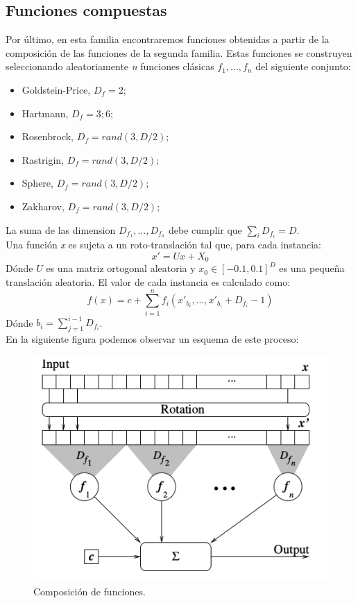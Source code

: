 \subsection{Funciones compuestas} 

Por último, en esta familia encontraremos funciones obtenidas a partir de la composición de las funciones de la segunda familia. Estas funciones se construyen seleccionando aleatoriamente \textit{n} funciones clásicas $f_{1},...,f_{n}$ del siguiente conjunto: 
    	  \begin{itemize}
    	  	\item Goldstein-Price, $D_{f} = 2$;
    	  	\item Hartmann, $D_{f} = 3; 6;$
    	  	\item Rosenbrock, $D_{f} = rand(3, D/2);$
    	  	\item Rastrigin, $D_{f} = rand(3, D/2);$
    	  	\item Sphere, $D_{f} = rand(3, D/2);$
    	  	\item Zakharov, $D_{f} = rand(3, D/2);$
    	  \end{itemize}
    La suma de las dimension $D_{f_{1}},...,D_{f_{n}}$ debe cumplir que $\sum_{i}{D_{f_{i}}} = D$. \\
    Una función \textit{x} es sujeta a un roto-translación tal que, para cada instancia: 
    \begin{equation}
    	x' = Ux + X_{0}
    \end{equation}
    Dónde $U$ es una matriz ortogonal aleatoria y $x_{0}\in[-0.1, 0.1]^{D}$ es una pequeña translación aleatoria. El valor de cada instancia es calculado como: 
    \begin{equation}
    	f(x) = c + \sum^{n}_{i=1}{f_{i}(x'_{b_{i}},...,x'_{b_{i}} + D_{f_{i}} - 1)}
    \end{equation}
    Dónde $b_{i} = \sum^{i-1}_{j=1}{D_{f_{i}}}$. \\
    En la siguiente figura podemos observar un esquema de este proceso: 
    	  \begin{figure}[!ht]
  				\centering
					\includegraphics[scale=0.5]{images/composicion}
  				\caption{Composición de funciones.}
				\end{figure}

